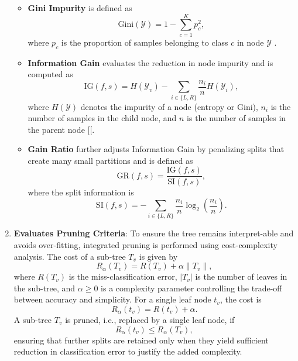 \begin{enumerate}
  \begin{itemize}
  \item
    \textbf{Gini Impurity} is defined as \[\text{Gini}(\mathcal{Y}) = 1 - \sum_{c=1}^{K} p_c^2,\]where \(p_c\) is the proportion of samples belonging to class \(c\) in node \(\mathcal{Y}\) \citep{breiman1984}.
  \item
    \textbf{Information Gain} evaluates the reduction in node impurity and is computed as \[\text{IG}(f, s) = H(\mathcal{Y}_v) - \sum_{i \in \{L, R\}} \frac{n_i}{n} H(\mathcal{Y}_i),\]where \(H(\mathcal{Y})\) denotes the impurity of a node (entropy or Gini), \(n_i\) is the number of samples in the child node, and \(n\) is the number of samples in the parent node {[}\citet{breiman1984}{[}.
  \item
    \textbf{Gain Ratio} further adjusts Information Gain by penalizing splits that create many small partitions \citep{quinlan1993} and is defined as \[\text{GR}(f, s) = \frac{\text{IG}(f, s)}{\text{SI}(f, s)},\]where the split information is \[\text{SI}(f, s) = -\sum_{i \in \{L, R\}} \frac{n_i}{n} \log_2\left(\frac{n_i}{n}\right).\]
  \end{itemize}
\item
  \textbf{Evaluates Pruning Criteria}: To ensure the tree remains interpret-able and avoids over-fitting, integrated pruning is performed using cost-complexity analysis. The cost of a sub-tree \(T_v\) is given by \[R_\alpha(T_v) = R(T_v) + \alpha \|T_v\|,\] where \(R(T_v)\) is the miss-classification error, \(|T_v|\) is the number of leaves in the sub-tree, and \(\alpha \geq 0\) is a complexity parameter controlling the trade-off between accuracy and simplicity. For a single leaf node \(t_v\), the cost is \[R_\alpha(t_v) = R(t_v) + \alpha.\] A sub-tree \(T_v\) is pruned, i.e., replaced by a single leaf node, if \[R_\alpha(t_v) \leq R_\alpha(T_v),\]ensuring that further splits are retained only when they yield sufficient reduction in classification error to justify the added complexity.
\end{enumerate}

